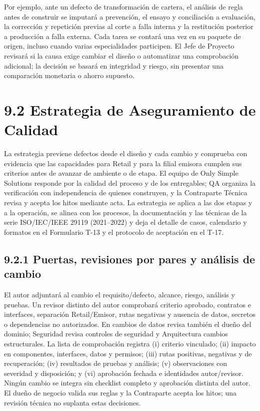 \documentclass[11pt]{article}
\begin{document}
Por ejemplo, ante un defecto de transformación de cartera, el análisis de regla antes de construir se imputará a prevención, el ensayo y conciliación a evaluación, la corrección y repetición previas al corte a falla interna y la restitución posterior a producción a falla externa. Cada tarea se contará una vez en su paquete de origen, incluso cuando varias especialidades participen. El Jefe de Proyecto revisará si la causa exige cambiar el diseño o automatizar una comprobación adicional; la decisión se basará en integridad y riesgo, sin presentar una comparación monetaria o ahorro supuesto.

\section{9.2 Estrategia de Aseguramiento de Calidad}

La estrategia previene defectos desde el diseño y cada cambio y comprueba con evidencia que las capacidades para Retail y para la filial emisora cumplen sus criterios antes de avanzar de ambiente o de etapa. El equipo de Only Simple Solutions responde por la calidad del proceso y de los entregables; QA organiza la verificación con independencia de quienes construyen, y la Contraparte Técnica revisa y acepta los hitos mediante acta. La estrategia se aplica a las dos etapas y a la operación, se alinea con los procesos, la documentación y las técnicas de la serie ISO/IEC/IEEE 29119 (2021--2022) y deja el detalle de casos, calendario y formatos en el Formulario T-13 y el protocolo de aceptación en el T-17.

\subsection{9.2.1 Puertas, revisiones por pares y análisis de cambio}

El autor adjuntará al cambio el requisito/defecto, alcance, riesgo, análisis y pruebas. Un revisor distinto del autor comprobará criterio aprobado, contratos e interfaces, separación Retail/Emisor, rutas negativas y ausencia de datos, secretos o dependencias no autorizados. En cambios de datos revisa también el dueño del dominio; Seguridad revisa controles de seguridad y Arquitectura cambios estructurales. La lista de comprobación registra  (i) criterio vinculado; (ii) impacto en componentes, interfaces, datos y permisos; (iii) rutas positivas, negativas y de recuperación; (iv) resultados de pruebas y análisis; (v) observaciones con severidad y disposición; y (vi) aprobación fechada e identidades autor/revisor. Ningún cambio se integra sin checklist completo y aprobación distinta del autor. El dueño de negocio valida sus reglas y la Contraparte acepta los hitos; una revisión técnica no suplanta estas decisiones.
\end{document}
